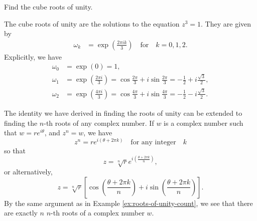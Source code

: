 \begin{example}
    Find the cube roots of unity.

    \begin{solution}
        The cube roots of unity are the solutions to the equation \(z^3 = 1\). They are given by
        \[
            \begin{aligned}
                \omega_k &= \exp\left(\frac{2\pi i k}{3}\right) \quad \text{for} \quad k = 0, 1, 2.
            \end{aligned}
        \]
        Explicitly, we have
        \[
            \begin{aligned}
                \omega_0 &= \exp(0) = 1, \\
                \omega_1 &= \exp\left(\frac{2\pi i}{3}\right) = \cos\frac{2\pi}{3} + i\sin\frac{2\pi}{3} = -\frac{1}{2} + i\frac{\sqrt{3}}{2}, \\
                \omega_2 &= \exp\left(\frac{4\pi i}{3}\right) = \cos\frac{4\pi}{3} + i\sin\frac{4\pi}{3} = -\frac{1}{2} - i\frac{\sqrt{3}}{2}.
            \end{aligned}
        \]
    \end{solution}
\end{example}

\begin{example}
    The identity we have derived in finding the roots of unity can be extended to finding the \(n\)-th roots of any complex number. If \(w\) is a complex number such that \(w = re^{i\theta}\), and \(z^n = w\), we have
    \[
        z^n = re^{i(\theta + 2\pi k)} \quad \text{for any integer} \quad k
    \]
    so that
    \[
        z = \sqrt[n]{r}e^{i\left(\frac{\theta + 2\pi k}{n}\right)},
    \]
    or alternatively,
    \[
        z = \sqrt[n]{r}\left[\cos\left(\frac{\theta + 2\pi k}{n}\right) + i\sin\left(\frac{\theta + 2\pi k}{n}\right)\right].
    \]
    By the same argument as in Example \ref{ex:roots-of-unity-count}, we see that there are exactly \(n\) \(n\)-th roots of a complex number \(w\).
\end{example}

